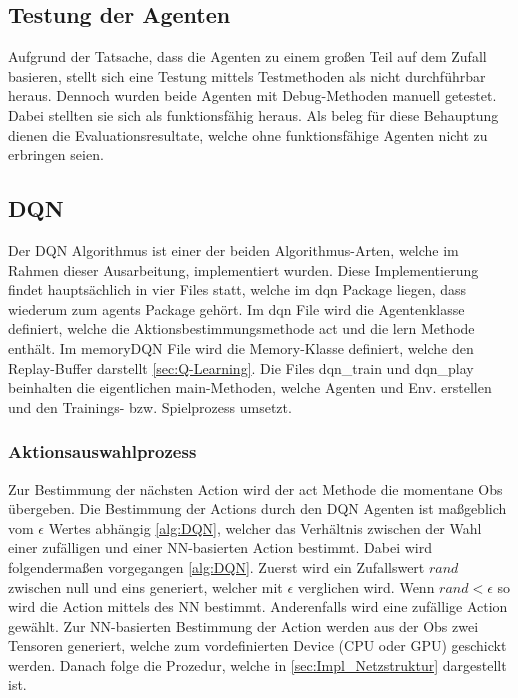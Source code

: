 \subsection{Testung der Agenten}
Aufgrund der Tatsache, dass die Agenten zu einem großen Teil auf dem Zufall basieren, stellt sich eine Testung mittels Testmethoden als nicht durchführbar heraus. Dennoch wurden beide Agenten mit Debug-Methoden manuell getestet. Dabei stellten sie sich als funktionsfähig heraus. Als beleg für diese Behauptung dienen die Evaluationsresultate, welche ohne funktionsfähige Agenten nicht zu erbringen seien.

\subsection{DQN} \label{sec:Impl:DQN}
Der DQN Algorithmus ist einer der beiden Algorithmus-Arten, welche im Rahmen dieser Ausarbeitung, implementiert wurden. Diese Implementierung findet hauptsächlich in vier Files statt, welche im dqn Package liegen, dass wiederum zum agents Package gehört.
Im dqn File wird die Agentenklasse definiert, welche die Aktionsbestimmungsmethode act und die lern Methode enthält. 
Im memoryDQN File wird die Memory-Klasse definiert, welche den Replay-Buffer darstellt \ref{sec:Q-Learning}. 
Die Files dqn\_train und dqn\_play beinhalten die eigentlichen main-Methoden, welche Agenten und Env. erstellen und den Trainings- bzw. Spielprozess umsetzt.

\subsubsection{Aktionsauswahlprozess} \label{sec:Impl_DQN_Aktionsauswahlprozess}
Zur Bestimmung der nächsten Action wird der act Methode die momentane Obs übergeben.
Die Bestimmung der Actions durch den DQN Agenten ist maßgeblich vom $\epsilon$ Wertes abhängig \ref{alg:DQN}, welcher das Verhältnis zwischen der Wahl einer zufälligen und einer NN-basierten Action bestimmt. Dabei wird folgendermaßen vorgegangen \ref{alg:DQN}.
Zuerst wird ein Zufallswert $rand$ zwischen null und eins generiert, welcher mit $\epsilon$ verglichen wird. Wenn $rand < \epsilon$ so wird die Action mittels des NN bestimmt. Anderenfalls wird eine zufällige Action gewählt.
Zur NN-basierten Bestimmung der Action werden aus der Obs zwei Tensoren generiert, welche zum vordefinierten Device (CPU oder GPU) geschickt werden. Danach folge die Prozedur, welche in \ref{sec:Impl_Netzstruktur} dargestellt ist.

